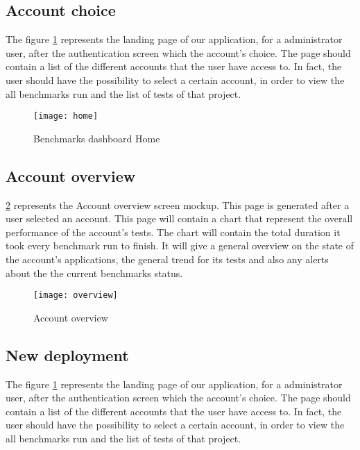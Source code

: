 \subsection{Account choice}
The figure
\hyperref[fig:benchmarks_dashboard_home]{\ref{fig:benchmarks_dashboard_home}}
represents the landing page of our application, for a administrator user,
after the authentication screen which the account's choice. The page should
contain a list of the different accounts that the user have access to. In fact,
the user should have the possibility to select a certain account, in order to
view the all benchmarks run and the list of tests of that project.

\begin{figure}[ht]
\texttt{[image: home]}
\caption{Benchmarks dashboard Home}
\label{fig:benchmarks_dashboard_home}
\end{figure}

\subsection{Account overview}
\hyperref[fig:benchmarks_dashboard_overview]{\ref{fig:benchmarks_dashboard_overview}}
represents the Account overview screen mockup. This page is generated after a
user selected an account. This page will contain a chart that represent the
overall performance of the account's tests. The chart will contain the total
duration it took every benchmark run to finish. It will give a general overview
on the state of the account's applications, the general trend for its tests and
also any alerts about the the current benchmarks status.

\begin{figure}[ht]
\texttt{[image: overview]}
\caption{Account overview}
\label{fig:benchmarks_dashboard_overview}
\end{figure}

\subsection{New deployment}
The figure
\hyperref[fig:benchmarks_dashboard_home]{\ref{fig:benchmarks_dashboard_home}}
represents the landing page of our application, for a administrator user,
after the authentication screen which the account's choice. The page should
contain a list of the different accounts that the user have access to. In fact,
the user should have the possibility to select a certain account, in order to
view the all benchmarks run and the list of tests of that project.

